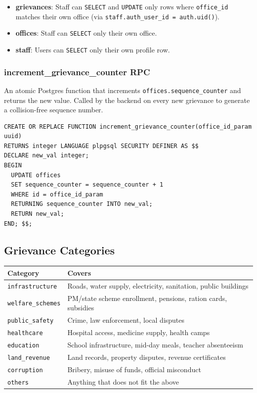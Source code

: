 \documentclass[11pt, a4paper]{article}
\begin{document}
\begin{itemize}[leftmargin=1.5em]
  \item \textbf{grievances}: Staff can \texttt{SELECT} and \texttt{UPDATE} only rows where \texttt{office\_id} matches their own office (via \texttt{staff.auth\_user\_id = auth.uid()}).
  \item \textbf{offices}: Staff can \texttt{SELECT} only their own office.
  \item \textbf{staff}: Users can \texttt{SELECT} only their own profile row.
\end{itemize}

\subsubsection{increment\_grievance\_counter RPC}

An atomic Postgres function that increments \texttt{offices.sequence\_counter} and returns the new value. Called by the backend on every new grievance to generate a collision-free sequence number.

\begin{lstlisting}[style=sql, caption={increment\_grievance\_counter function}]
CREATE OR REPLACE FUNCTION increment_grievance_counter(office_id_param uuid)
RETURNS integer LANGUAGE plpgsql SECURITY DEFINER AS $$
DECLARE new_val integer;
BEGIN
  UPDATE offices
  SET sequence_counter = sequence_counter + 1
  WHERE id = office_id_param
  RETURNING sequence_counter INTO new_val;
  RETURN new_val;
END; $$;
\end{lstlisting}

\subsection{Grievance Categories}

\begin{tabularx}{\linewidth}{lX}
\toprule
\textbf{Category} & \textbf{Covers} \\
\midrule
\texttt{infrastructure}   & Roads, water supply, electricity, sanitation, public buildings \\
\texttt{welfare\_schemes} & PM/state scheme enrollment, pensions, ration cards, subsidies \\
\texttt{public\_safety}   & Crime, law enforcement, local disputes \\
\texttt{healthcare}       & Hospital access, medicine supply, health camps \\
\texttt{education}        & School infrastructure, mid-day meals, teacher absenteeism \\
\texttt{land\_revenue}    & Land records, property disputes, revenue certificates \\
\texttt{corruption}       & Bribery, misuse of funds, official misconduct \\
\texttt{others}           & Anything that does not fit the above \\
\bottomrule
\end{tabularx}
\end{document}
